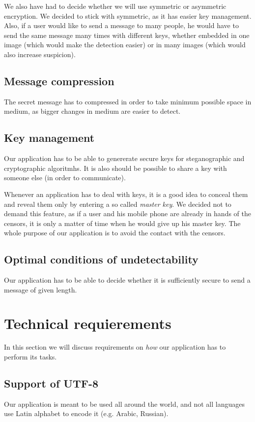 We also have had to decide whether we will use symmetric or asymmetric
encryption. We decided to stick with symmetric, as it has easier key management.
Also, if a user would like to send a message to many people, he would have to
send the same message many times with different keys, whether embedded in one 
image (which would make the detection easier) or in many images (which would
also increase suspicion).

\subsection{Message compression}
The secret message has to compressed in order to take minimum possible space in medium,
as bigger changes in medium are easier to detect.

\subsection{Key management}
Our application has to be able to genererate secure keys for steganographic and
cryptographic algoritmhs. It is also should be possible to share a key with someone
else (in order to communicate).

Whenever an application has to deal with keys, it is a good idea to conceal them
and reveal them only by entering a so called \emph{master key}. We decided not to demand
this feature, as if a user and his mobile phone are already in hands of the censors, it is only 
a matter of time when he would give up his master key. The whole purpose of our application
is to avoid the contact with the censors.

\subsection{Optimal conditions of undetectability}
Our application has to be able to decide whether it is sufficiently secure to 
send a message of given length. 



\section{Technical requierements}
In this section we will discuss requirements on \emph{how} our application has
to perform its tasks.

\subsection{Support of UTF-8}
Our application is meant to be used all around the world, and not all languages use
Latin alphabet to encode it (e.g. Arabic, Russian). 

